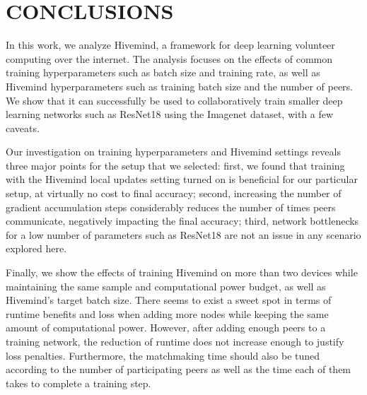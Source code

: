 \chapter{CONCLUSIONS}\label{chapter:conclusions}
In this work, we analyze Hivemind, a framework for deep learning volunteer computing over the internet.
The analysis focuses on the effects of common training hyperparameters such as batch size and training rate, as well as Hivemind hyperparameters such as training batch size and the number of peers.
We show that it can successfully be used to collaboratively train smaller deep learning networks such as ResNet18 using the Imagenet dataset, with a few caveats.

Our investigation on training hyperparameters and Hivemind settings reveals three major points for the setup that we selected:
first, we found that training with the Hivemind local updates setting turned on is beneficial for our particular setup, at virtually no cost to final accuracy;
second, increasing the number of gradient accumulation steps considerably reduces the number of times peers communicate, negatively impacting the final accuracy;
third, network bottlenecks for a low number of parameters such as ResNet18 are not an issue in any scenario explored here.

Finally, we show the effects of training Hivemind on more than two devices while maintaining the same sample and computational power budget, as well as Hivemind's target batch size.
There seems to exist a sweet spot in terms of runtime benefits and loss when adding more nodes while keeping the same amount of computational power.
However, after adding enough peers to a training network, the reduction of runtime does not increase enough to justify loss penalties.
Furthermore, the matchmaking time should also be tuned according to the number of participating peers as well as the time each of them takes to complete a training step.
